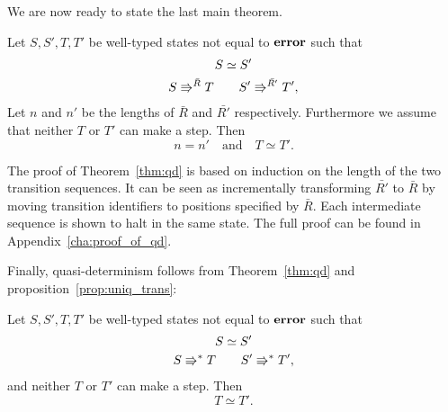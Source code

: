 We are now ready to state the last main theorem.

\begin{theorem} \label{thm:qd}
  Let $S, S', T, T'$ be well-typed states not equal to $\mbox{{\bf error}}$ such that
  \begin{equation*}
    \begin{gathered}
      S \simeq S' \\
      S \Rrightarrow^{\bar{R}} T \quad\quad S' \Rrightarrow^{\bar{R'}} T',
    \end{gathered}
  \end{equation*}
  Let $n$ and $n'$ be the lengths of $\bar{R}$ and $\bar{R'}$ respectively.
  Furthermore we assume that neither $T$ or $T'$ can make a step. Then
  \begin{equation*}
    n = n' \quad \text{and} \quad T \simeq T'.
  \end{equation*}
\end{theorem}

The proof of Theorem~\ref{thm:qd} is based on induction on the length of the two
transition sequences. It can be seen as incrementally transforming $\bar{R'}$ to
$\bar{R}$ by moving transition identifiers to positions specified by $\bar{R}$.
Each intermediate sequence is shown to halt in the same state. The full proof
can be found in Appendix~\ref{cha:proof_of_qd}.

Finally, quasi-determinism follows from Theorem~\ref{thm:qd} and
proposition~\ref{prop:uniq_trans}:
\begin{corollary}
  Let $S, S', T, T'$ be well-typed states not equal to $\mbox{{\bf error}}$ such that
  \begin{equation*}
    \begin{gathered}
      S \simeq S' \\
      S \Rrightarrow^* T \quad\quad S' \Rrightarrow^* T',
    \end{gathered}
  \end{equation*}
  and neither $T$ or $T'$ can make a step.  Then
  \begin{equation*}
    T \simeq T'.
  \end{equation*}
\end{corollary}

%
%
